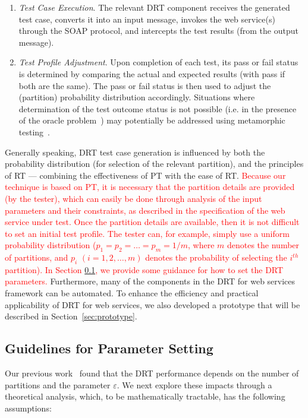 \documentclass[10pt,journal,compsoc]{IEEEtran}
\begin{document}
\begin{enumerate}[1)]
  \item
  \emph{Test Case Execution}.
  The relevant DRT component receives the generated test case, converts it into an input message, invokes the web service(s) through the SOAP protocol, and intercepts the test results (from the output message).

  \item
  \emph{Test Profile Adjustment}.
  Upon completion of each test, its pass or fail status is determined by comparing the actual and expected results (with pass if both are the same).
  The pass or fail status is then used to adjust the (partition) probability distribution accordingly.
  Situations where determination of the test outcome status is not possible (i.e. in the presence of the oracle problem~\cite{weyuker1982testing, barr2015oracle, patel2018mapping}) may potentially be addressed using metamorphic testing~\cite{sun2011}.
\end{enumerate}
Generally speaking, DRT test case generation is influenced by both the probability distribution (for selection of the relevant partition), and the principles of RT
---
combining the effectiveness of PT with the ease of RT.
\textcolor{red}{Because our technique is based on PT, it is necessary that the partition details are provided (by the tester), which can easily be done through analysis of the input parameters and their constraints, as described in the specification of the web service under test. Once the partition details are available, then it is not difficult to set an initial test profile. The tester can, for example, simply use a uniform probability distribution ($p_1 = p_2 = \ldots = p_m = 1 / m$, where $m$ denotes the number of partitions, and $p_i $ $(i = 1,2,\ldots,m)$ denotes the probability of selecting the $i^{th}$ partition). In Section \ref{sec:relation}, we provide some guidance for how to set the DRT parameters.}
Furthermore, many of the components in the DRT for web services framework can be automated.
To enhance the efficiency and practical applicability of DRT for web services, we also developed a prototype that will be described in Section~\ref{sec:prototype}.

\subsection{Guidelines for Parameter Setting}
\label{sec:relation}

Our previous work~\cite{sun2012towards} found that the DRT performance depends on the number of partitions and the parameter $\varepsilon$.
We next explore these impacts through a theoretical analysis, which, to be mathematically tractable, has the following assumptions:
\end{document}
